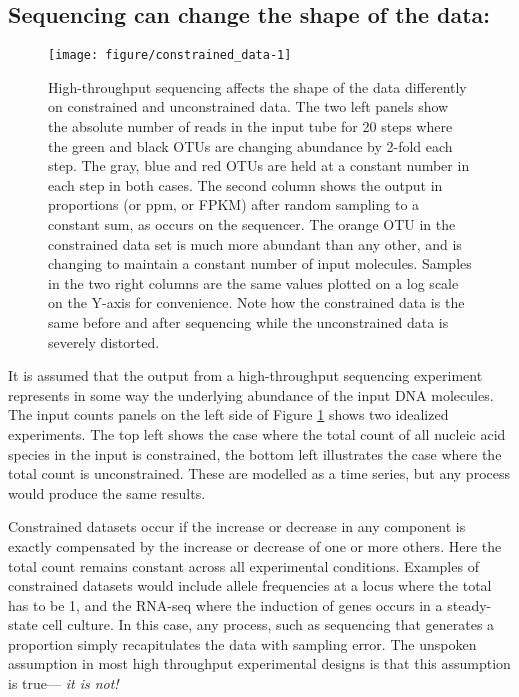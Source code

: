 \documentclass[11pt]{article}\usepackage[]{graphicx}\usepackage[]{color}
\makeatletter
\def\maxwidth{ %
  \ifdim\Gin@nat@width>\linewidth
    \linewidth
  \else
    \Gin@nat@width
  \fi
}
\newenvironment{knitrout}{}{} %
\makeatother
\begin{document}
\subsection{Sequencing can change the shape of the data:}

\begin{figure}
\begin{center}

\begin{knitrout}
\color{fgcolor}
\texttt{[image: figure/constrained\_data-1]} 

\end{knitrout}
\caption{High-throughput sequencing affects the shape of the data differently on constrained and unconstrained data. The two left panels show the absolute number of reads in the input tube for 20 steps where the green and black OTUs are changing abundance by 2-fold each step. The gray, blue and red OTUs are held at a constant number in each step in both cases.  The second column shows the output in proportions (or ppm, or FPKM) after random sampling to a constant sum, as occurs on the sequencer. The orange OTU in the constrained data set is much more abundant than any other, and is changing to maintain a constant number of input molecules.  Samples in the two right columns are the same values plotted on a log scale on the Y-axis for convenience. Note how the constrained data is the same before and after sequencing while the unconstrained data is severely distorted. }
\label{constant}
\end{center}
\end{figure}
It is  assumed that the output from a high-throughput sequencing experiment represents in some way the underlying abundance of the input DNA molecules. The input counts panels on the left side of Figure \ref{constant} shows two  idealized experiments. The top left shows the case where the total count of all nucleic acid species in the input is constrained, the bottom left illustrates the case where the total count is unconstrained. These are modelled as a time series, but any  process would produce the same results. 

Constrained datasets  occur if the increase or decrease in any component is exactly compensated by the increase or decrease of one or more others. Here the total  count  remains constant across all experimental conditions. Examples of constrained datasets would include  allele frequencies at a locus where the total has to be 1, and the RNA-seq where the induction of genes occurs in a steady-state cell culture. In this case, any process, such as sequencing that generates a proportion simply recapitulates the data with sampling error. The unspoken assumption in most high throughput experimental designs is that this assumption is true---\emph{ it is not!}
\end{document}
